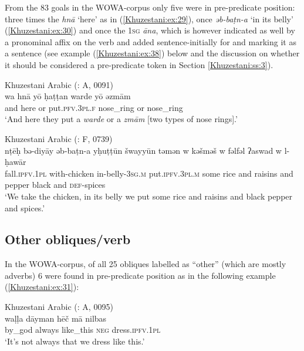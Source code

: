 \documentclass[output=paper,colorlinks,citecolor=brown,draftmode]{langscibook}
\begin{document}
From the 83 goals in the WOWA-corpus only five were in pre-predicate position: three times the  \textit{hnā} `here' as in (\ref{Khuzestani:ex:29}), once \textit{əb-baṭn-a} `in its belly' (\ref{Khuzestani:ex:30}) and once the \textsc{1sg}  \textit{āna}, which is however indicated as well by a pronominal affix on the verb and added sentence-initially for  and marking it as a sentence  (see example (\ref{Khuzestani:ex:38}) below and the discussion on whether it should be considered a pre-predicate token in Section \ref{Khuzestani:ss:3}). 

\ea\label{Khuzestani:ex:29}
Khuzestani Arabic (\citealt{leitnerArabic2021}: A, 0091) \\
\gll wa hnā yō ḥaṭṭan warde yō əzmām \\
and here or put\textsc{.pfv.3pl.f} nose\_ring or nose\_ring \\
\glt `And here they put a \textit{warde} or a \textit{zmām} [two types of nose rings].' 
\z

\ea\label{Khuzestani:ex:30}
Khuzestani Arabic (\citealt{leitnerArabic2021}: F, 0739) \\
\gll nṭēḥ bə-diyāy əb-baṭn-a yḥuṭṭūn šwayyūn təmən w kəšməš w fəlfəl ʔaswad w l-ḥawār \\
fall\textsc{.ipfv.1pl} with-chicken in-belly\textsc{-3sg.m} put\textsc{.ipfv.3pl.m} some rice and raisins and pepper black and \textsc{def}-spices \\
\glt `We take the chicken, in its belly we put some rice and raisins and black pepper and spices.' 
\z

\subsection{Other obliques/verb}\label{Khuzestani:ss:2.11}
In the WOWA-corpus, of all 25 obliques labelled as ``other'' (which are mostly adverbs) 6 were found in pre-predicate position as in the following example (\ref{Khuzestani:ex:31}): 

\ea\label{Khuzestani:ex:31}
Khuzestani Arabic (\citealt{leitnerArabic2021}: A, 0095) \\
\gll waḷḷa dāyman hēč mā nilbas \\
by\_god always like\_this \textsc{neg} dress\textsc{.ipfv.1pl} \\
\glt `It's not always that we dress like this.' 
\z
\end{document}
